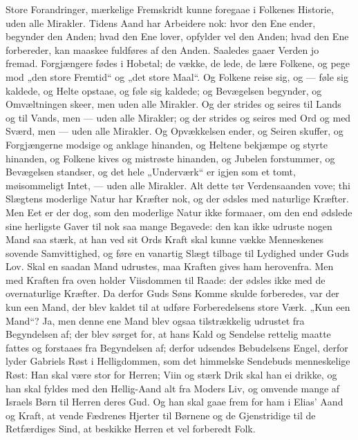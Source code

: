 \documentclass[12pt,a4paper]{book}
\begin{document}
Store Forandringer, mærkelige Fremskridt kunne foregaae i Folkenes
Historie, uden alle Mirakler. Tidens Aand har Arbeidere nok: hvor den Ene
ender, begynder den Anden; hvad den Ene lover, opfylder vel den Anden;
hvad den Ene forbereder, kan maaskee fuldføres af den Anden. Saaledes
gaaer Verden jo fremad. Forgjængere fødes i Hobetal; de vække, de lede,
de lære Folkene, og pege mod „den store Fremtid“ og „det store Maal“. Og
Folkene reise sig, og --- føle sig kaldede, og Helte opstaae, og føle sig
kaldede; og Bevægelsen begynder, og Omvæltningen skeer, men uden alle
Mirakler. Og der strides og seires til Lands og til Vands, men --- uden
alle Mirakler; og der strides og seires med Ord og med Sværd, men ---
uden alle Mirakler. Og Opvækkelsen ender, og Seiren skuffer, og
Forgjængerne modsige og anklage hinanden, og Heltene bekjæmpe og styrte
hinanden, og Folkene kives og mistrøste hinanden, og Jubelen forstummer,
og Bevægelsen standser, og det hele „Underværk“ er igjen som et tomt,
møisommeligt Intet, --- uden alle Mirakler. Alt dette tør Verdensaanden
vove; thi Slægtens moderlige Natur har Kræfter nok, og der ødsles med
naturlige Kræfter. Men Eet er der dog, som den moderlige Natur ikke
formaaer, om den end ødslede sine herligste Gaver til nok saa mange
Begavede: den kan ikke udruste nogen Mand saa stærk, at han ved sit Ords
Kraft skal kunne vække Menneskenes sovende Samvittighed, og føre en
vanartig Slægt tilbage til Lydighed under Guds Lov. Skal en saadan Mand
udrustes, maa Kraften gives ham herovenfra. Men
med Kraften fra oven holder Viisdommen til Raade: der ødsles ikke med de
overnaturlige Kræfter. Da derfor Guds Søns Komme skulde forberedes, var der
kun een Mand, der blev kaldet til at udføre Forberedelsens store Værk. „Kun
een Mand“? Ja, men denne ene Mand blev ogsaa tilstrækkelig udrustet fra
Begyndelsen af; der blev sørget for, at hans Kald og Sendelse rettelig maatte
fattes og forstaaes fra Begyndelsen af; derfor udsendes Bebudelsens Engel,
derfor lyder Gabriels Røst i Helligdommen, som det himmelske Sendebuds
menneskelige Røst:
{\large Han skal være stor for Herren; Viin og stærk Drik skal han ei drikke,
og han skal fyldes med den Hellig-Aand alt fra Moders Liv, og omvende mange
af Israels Børn til Herren deres Gud. Og han skal gaae frem for ham i Elias'
Aand og Kraft, at vende Fædrenes Hjerter til Børnene og de Gjenstridige til
de Retfærdiges Sind, at beskikke Herren et vel forberedt Folk.}
\end{document}
